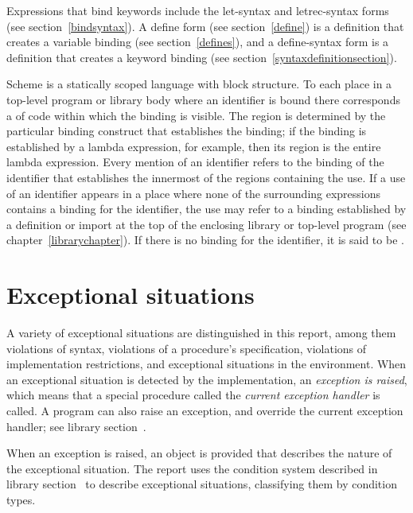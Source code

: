 Expressions that bind keywords include the {\cf
  let-syntax} and {\cf letrec-syntax} forms (see
section~\ref{bindsyntax}).  A {\cf define} form (see section~\ref{define}) is a
definition that creates a variable binding (see
section~\ref{defines}), and a {\cf define-syntax} form is
a definition that creates a keyword binding (see
section~\ref{syntaxdefinitionsection}).

\vest Scheme is a statically scoped language with
block structure.  To each place in a top-level program or library body where an identifier is bound
there corresponds a  of code within which
the binding is visible.  The region is determined by the particular
binding construct that establishes the binding; if the binding is
established by a {\cf lambda} expression, for example, then its region
is the entire {\cf lambda} expression.  Every mention of an identifier
refers to the binding of the identifier that establishes the
innermost of the regions containing the use.  If a use of an
identifier appears in a place where none of the surrounding expressions
contains a binding for the identifier, the use may refer to a
binding established by a definition or import at the top of the
enclosing library or top-level program
(see chapter~\ref{librarychapter}).
If there is no binding for the identifier,
it is said to be .

\section{Exceptional situations}
\label{exceptionalsituationsection}

A variety of exceptional situations
are distinguished in this report, among them violations of syntax,
violations of a procedure's specification, violations of
implementation restrictions, and exceptional situations in the
environment.  When an exceptional situation is detected by the
implementation, an \textit{exception is raised},
which means that a special procedure called the \textit{current
  exception handler} is called.  A program can also raise an
exception, and override the current exception handler; see
library section~.

When an exception is raised, an object is provided that
describes the nature of the exceptional situation.  The report uses
the condition system described in library section~ to
describe exceptional situations, classifying them by condition types.

